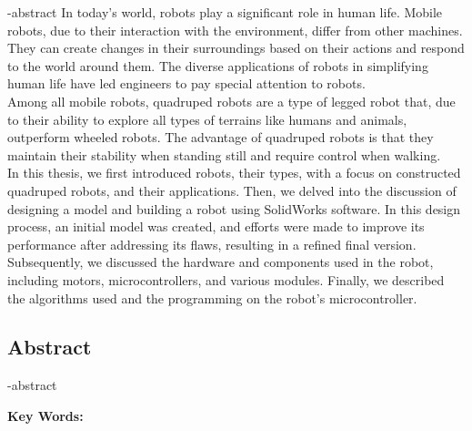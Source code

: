 
\en-abstract{
In today's world, robots play a significant role in human life. Mobile robots, due to their interaction with the environment, differ from other machines. They can create changes in their surroundings based on their actions and respond to the world around them. The diverse applications of robots in simplifying human life have led engineers to pay special attention to robots.
\\
Among all mobile robots, quadruped robots are a type of legged robot that, due to their ability to explore all types of terrains like humans and animals, outperform wheeled robots. The advantage of quadruped robots is that they maintain their stability when standing still and require control when walking.
\\
In this thesis, we first introduced robots, their types, with a focus on constructed quadruped robots, and their applications. Then, we delved into the discussion of designing a model and building a robot using SolidWorks software. In this design process, an initial model was created, and efforts were made to improve its performance after addressing its flaws, resulting in a refined final version. Subsequently, we discussed the hardware and components used in the robot, including motors, microcontrollers, and various modules. Finally, we described the algorithms used and the programming on the robot's microcontroller. 
}

\newpage
\thispagestyle{empty}
\begin{latin}
	\begin{flushleft}
	\section*{\LARGE\centering Abstract}

	\een-abstract

	\vspace*{.5cm}
	{\large\textbf{Key Words:}}\par
	\vspace*{.5cm}
	\elatinkeywords
	\end{flushleft}
\end{latin}